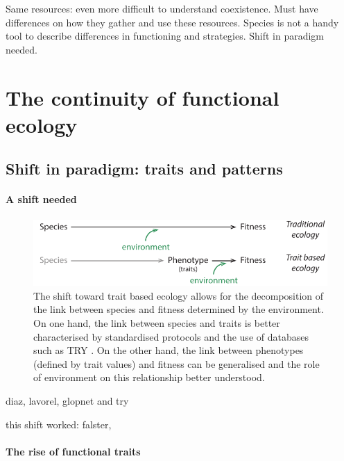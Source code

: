 Same resources: even more difficult to understand coexistence. Must have differences on how they gather and use these resources. Species is not a handy tool to describe differences in functioning and strategies. Shift in paradigm needed.

\section{The continuity of functional ecology}

\subsection{Shift in paradigm: traits and patterns}

\paragraph{A shift needed}

\begin{figure}
    \includegraphics[width=1\linewidth]{./2_PP/Figures/Concepts/species_to_fitness.pdf}
  \caption[From discrete to continuous link between species and fitness]{The shift toward trait based ecology allows for the decomposition of the link between species and fitness determined by the environment. On one hand, the link between species and traits is better characterised by standardised protocols and the use of databases such as TRY \parencite{TRY}. On the other hand, the link between phenotypes (defined by trait values) and fitness can be generalised and the role of environment on this relationship better understood.}
  \label{fg:PCA_calibration}
\end{figure}

diaz, lavorel, glopnet and try

this shift worked: falster, 


\paragraph{The rise of functional traits}


